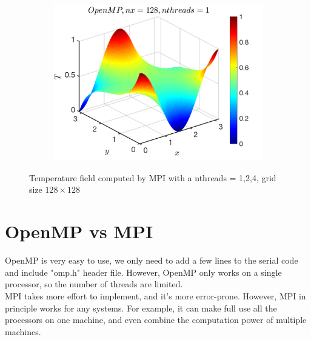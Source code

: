 \documentclass[a4paper]{article}
\begin{document}
\begin{figure}[H]
\begin{subfigure}[b]{0.32\textwidth}
        \end{subfigure}
        \
                \begin{subfigure}[b]{0.32\textwidth}   
            \centering 
            \includegraphics[width=\textwidth]{./Figure/heat_mpi_nx128_nth8.png} 
        \end{subfigure}
        \caption{Temperature field computed by MPI with a nthreads = 1,2,4, grid size $128\times128$}
    \end{figure}
    
    \section{OpenMP vs MPI}
OpenMP is very easy to use, we only need to add a few lines to the serial code and include "omp.h" header file. However, OpenMP only works on a single processor, so the number of threads are limited.\\

MPI takes more effort to implement, and it's more error-prone. However, MPI in principle works for any systems. For example, it can make full use all the processors on one machine, and even combine the computation power of multiple machines.
    
\end{document}
